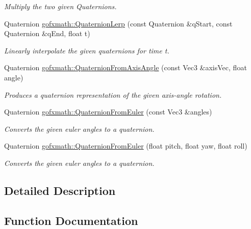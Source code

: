 \begin{DoxyCompactItemize}
\begin{DoxyCompactList}\small\item\em Multiply the two given Quaternions. \end{DoxyCompactList}\item 
Quaternion \hyperlink{group___s_i_s_d_vec_math_ga7d4ad4615b2edcd99e9dcf6f0afe74ca}{gofxmath\+::\+Quaternion\+Lerp} (const Quaternion \&q\+Start, const Quaternion \&q\+End, float t)
\begin{DoxyCompactList}\small\item\em Linearly interpolate the given quaternions for time t. \end{DoxyCompactList}\item 
Quaternion \hyperlink{group___s_i_s_d_vec_math_gabbc754cd1e171bd2d945376bb8a39a8f}{gofxmath\+::\+Quaternion\+From\+Axis\+Angle} (const Vec3 \&axis\+Vec, float angle)
\begin{DoxyCompactList}\small\item\em Produces a quaternion representation of the given axis-\/angle rotation. \end{DoxyCompactList}\item 
Quaternion \hyperlink{group___s_i_s_d_vec_math_ga6ea767e2a30159fd9c671ce16e949e38}{gofxmath\+::\+Quaternion\+From\+Euler} (const Vec3 \&angles)
\begin{DoxyCompactList}\small\item\em Converts the given euler angles to a quaternion. \end{DoxyCompactList}\item 
Quaternion \hyperlink{group___s_i_s_d_vec_math_gabcc390d952d7b142babc93c6faadef79}{gofxmath\+::\+Quaternion\+From\+Euler} (float pitch, float yaw, float roll)
\begin{DoxyCompactList}\small\item\em Converts the given euler angles to a quaternion. \end{DoxyCompactList}\end{DoxyCompactItemize}


\subsection{Detailed Description}


\subsection{Function Documentation}
\hypertarget{group___s_i_s_d_vec_math_gabbc754cd1e171bd2d945376bb8a39a8f}{}
